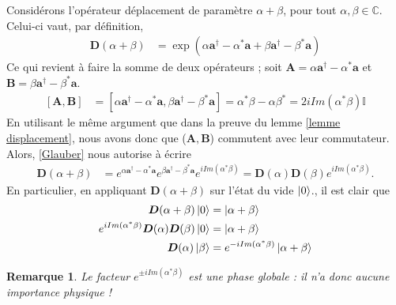 \documentclass[11pt,oneside,a4paper]{article}
\newtheorem{remark}[theorem]{Remarque}
\begin{document}
Considérons l'opérateur déplacement de paramètre $\alpha+\beta$, pour tout $\alpha,\beta\in\mathbb{C}$. Celui-ci vaut, par définition,
\begin{align*}
  \bm{D}(\alpha+\beta) &= \exp(\alpha\bm{a}^\dagger-\alpha^*\bm{a}+\beta\bm{a}^\dagger-\beta^*\bm{a})
\end{align*}
Ce qui revient à faire la somme de deux opérateurs ; soit $\bm{A} = \alpha\bm{a}^\dagger-\alpha^*\bm{a}$ et $\bm{B} = \beta\bm{a}^\dagger-\beta^*\bm{a}$.
\begin{align*}
  \left[\bm{A},\bm{B}\right] &= \left[\alpha\bm{a}^\dagger-\alpha^*\bm{a},\beta\bm{a}^\dagger-\beta^*\bm{a}\right] = \alpha^*\beta-\alpha\beta^* = 2i Im(\alpha^*\beta)\mathbb{I}
\end{align*}
En utilisant le même argument que dans la preuve du lemme \ref{lemme displacement}, nous avons donc que ($\bm{A},\bm{B}$) commutent avec leur commutateur. Alors, \eqref{Glauber} nous autorise à écrire
\begin{align*}
  \bm{D}(\alpha+\beta) &= e^{\alpha\bm{a}^\dagger-\alpha^*\bm{a}}e^{\beta\bm{a}^\dagger-\beta^*\bm{a}}e^{iIm(\alpha^*\beta)} = \bm{D}(\alpha)\bm{D}(\beta)e^{iIm(\alpha^*\beta)}.
\end{align*}
En particulier, en appliquant $\bm{D}(\alpha+\beta)$ sur l'état du vide $\ket{0}$., il est clair que
\begin{align}
  \bm{D}(\alpha+\beta)\ket{0} &= \ket{\alpha+\beta}\notag\\
  e^{iIm(\alpha^*\beta)}\bm{D}(\alpha)\bm{D}(\beta)\ket{0} &= \ket{\alpha+\beta}\notag\\
  \bm{D}(\alpha)\ket{\beta} &= e^{-iIm(\alpha^*\beta)}\ket{\alpha+\beta}\label{eq:deplacement sur etat coherent}
\end{align}
\begin{remark}
  Le facteur $e^{\pm iIm(\alpha^*\beta)}$ est une phase globale : il n'a donc aucune importance physique ! 
\end{remark}
\end{document}
